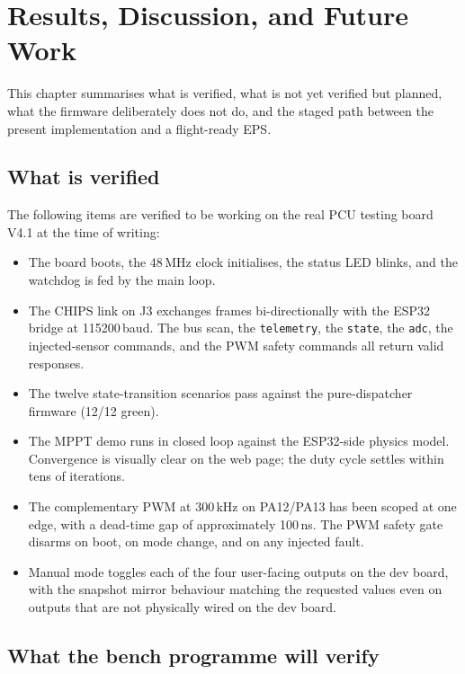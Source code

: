 \section{Results, Discussion, and Future Work}
\label{sec:results}

This chapter summarises what is verified, what is not yet
verified but planned, what the firmware deliberately does not
do, and the staged path between the present implementation and
a flight-ready EPS.

\subsection{What is verified}

The following items are verified to be working on the real PCU
testing board V4.1 at the time of writing:

\begin{itemize}
\item The board boots, the 48\,MHz clock initialises, the
status LED blinks, and the watchdog is fed by the main loop.
\item The CHIPS link on J3 exchanges frames bi-directionally
with the ESP32 bridge at 115200\,baud. The bus scan, the
\texttt{telemetry}, the \texttt{state}, the \texttt{adc}, the
injected-sensor commands, and the PWM safety commands all
return valid responses.
\item The twelve state-transition scenarios pass against the
pure-dispatcher firmware (12/12 green).
\item The MPPT demo runs in closed loop against the ESP32-side
physics model. Convergence is visually clear on the web page;
the duty cycle settles within tens of iterations.
\item The complementary PWM at 300\,kHz on PA12/PA13 has been
scoped at one edge, with a dead-time gap of approximately
100\,ns. The PWM safety gate disarms on boot, on mode change,
and on any injected fault.
\item Manual mode toggles each of the four user-facing outputs
on the dev board, with the snapshot mirror behaviour matching
the requested values even on outputs that are not physically
wired on the dev board.
\end{itemize}

\subsection{What the bench programme will verify}

